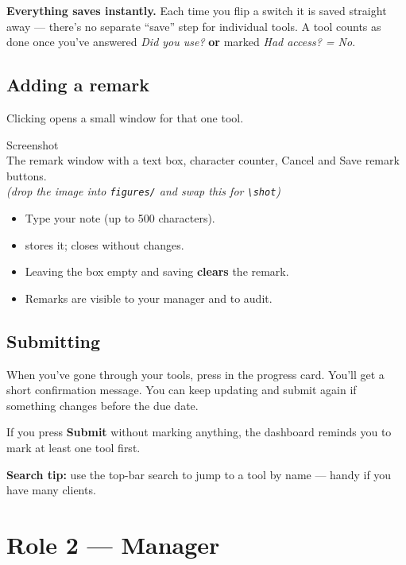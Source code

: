 \documentclass[11pt]{article}
\newcommand{\shotph}[1]{%
  \begin{center}
  \begin{tcolorbox}[enhanced, colback=soft, colframe=brand, boxrule=0pt,
       arc=4pt, left=8pt, right=8pt, top=20pt, bottom=20pt, width=\linewidth,
       borderline={0.6pt}{0pt}{brand, dashed}]
    \centering
    {\color{brand}\faImage\;\large Screenshot}\\[5pt]
    {\footnotesize\color{muted} #1}\\[3pt]
    {\scriptsize\color{muted}\itshape (drop the image into \texttt{figures/} and swap this for \texttt{{\textbackslash}shot})}
  \end{tcolorbox}
  \end{center}}
\begin{document}
\begin{notebox}
\faInfoCircle\; \textbf{Everything saves instantly.} Each time you flip a switch it
is saved straight away --- there's no separate ``save'' step for individual tools.
A tool counts as done once you've answered \emph{Did you use?} \textbf{or} marked
\emph{Had access? = No}.
\end{notebox}

\subsection{Adding a remark}
Clicking  opens a small window for that one tool.

\shotph{The remark window with a text box, character counter, Cancel and Save remark buttons.}

\begin{itemize}[leftmargin=1.4em]
  \item Type your note (up to 500 characters).
  \item {} stores it;  closes without changes.
  \item Leaving the box empty and saving \textbf{clears} the remark.
  \item Remarks are visible to your manager and to audit.
\end{itemize}

\subsection{Submitting}
When you've gone through your tools, press  in the progress
card. You'll get a short confirmation message. You can keep updating and submit
again if something changes before the due date.

\begin{warnbox}
\faExclamationTriangle\; If you press \textbf{Submit} without marking anything, the
dashboard reminds you to mark at least one tool first.
\end{warnbox}

\begin{tipbox}
\faLightbulb\; \textbf{Search tip:} use the top-bar search to jump to a tool by
name --- handy if you have many clients.
\end{tipbox}

\section{Role 2 --- Manager}
\end{document}
